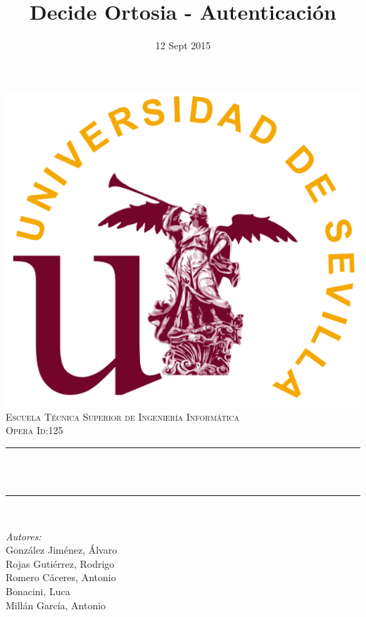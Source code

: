 \documentclass[12pt]{article}
\title{Decide Ortosia - Autenticación}								%
\date{12 Sept 2015}											%
\makeatletter
\let\thetitle\@title
\makeatother
\begin{document}

\begin{titlepage}
	\centering
    \vspace*{0.5 cm}
    \includegraphics[scale = 0.2]{logo.png}\\[1.0 cm]	%
    \textsc{\LARGE Escuela Técnica Superior de Ingeniería  \newline\newline Informática}\\[2.0 cm]	%
	\textsc{\Large Opera Id:125}\\[0.5 cm]				%
	\rule{\linewidth}{0.2 mm} \\[0.4 cm]
	{ \huge \bfseries \thetitle}\\
	\rule{\linewidth}{0.2 mm} \\[1.5 cm]
	
	\begin{minipage}{0.4\textwidth}
		\begin{flushleft} \large
			\emph{Autores:}\\
			González Jiménez, Álvaro \\		
			Rojas Gutiérrez, Rodrigo\\
            Romero Cáceres, Antonio\\
            Bonacini, Luca\\
            Millán García, Antonio \\
			\end{flushleft}
			\end{minipage}~
			\begin{minipage}{0.4\textwidth}
            

\end{minipage}
\end{titlepage}
\end{document}
